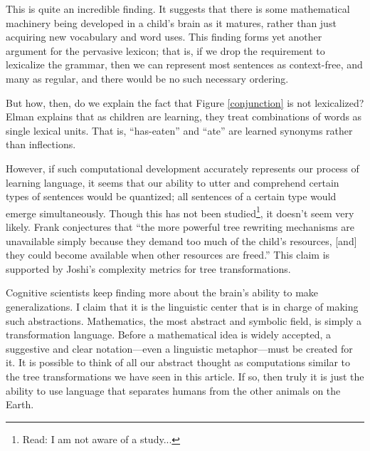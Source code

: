 \documentclass[12pt]{article}
\begin{document}
This is quite an incredible finding.  It suggests that there is some
mathematical machinery being developed in a child's brain as it matures,
rather than just acquiring new vocabulary and word uses.  This finding
forms yet another argument for the pervasive lexicon; that is, if we
drop the requirement to lexicalize the grammar, then we can represent
most sentences as context-free, and many as regular, and there would be
no such necessary ordering.

But how, then, do we explain the fact that Figure \ref{conjunction} is
not lexicalized?  Elman \cite{Elman-1990} explains that as children are
learning, they treat combinations of words as single lexical units.
That is, ``has-eaten'' and ``ate'' are learned synonyms rather than
inflections.

However, if such computational development accurately represents our
process of learning language, it seems that our ability to utter and
comprehend certain types of sentences would be quantized; all sentences
of a certain type would emerge simultaneously.  Though this has not been
studied\footnote{Read: I am not aware of a study...}, it doesn't seem
very likely.  Frank conjectures that ``the more powerful tree rewriting
mechanisms are unavailable simply because they demand too much of the
child's resources, [and] they could become available when other
resources are freed.''  This claim is supported by Joshi's complexity
metrics \cite{Joshi-1990} for tree transformations.

Cognitive scientists keep finding more about the brain's ability to make
generalizations.  I claim that it is the linguistic center that is in
charge of making such abstractions.  Mathematics, the most abstract and
symbolic field, is simply a transformation language.  Before a
mathematical idea is widely accepted, a suggestive and clear
notation---even a linguistic metaphor---must be created for it.  It is
possible to think of all our abstract thought as computations similar to
the tree transformations we have seen in this article.  If so, then
truly it is just the ability to use language that separates humans from
the other animals on the Earth.

\clearpage
\end{document}

